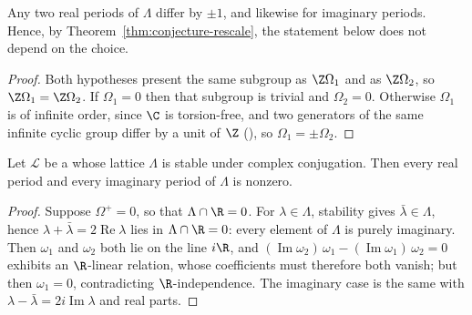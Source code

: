 \begin{lemma}
  \label{lem:periods-unique}
  Any two real periods of $\Lambda$ differ by $\pm1$, and likewise for imaginary periods.
  Hence, by Theorem~\ref{thm:conjecture-rescale}, the statement below does not depend on the
  choice.
\end{lemma}
\begin{proof}
  Both hypotheses present the same subgroup as $\Z\Omega_{1}$ and as $\Z\Omega_{2}$, so
  $\Z\Omega_{1}=\Z\Omega_{2}$. If $\Omega_{1}=0$ then that subgroup is trivial and
  $\Omega_{2}=0$. Otherwise $\Omega_{1}$ is of infinite order, since $\C$ is torsion-free, and
  two generators of the same infinite cyclic group differ by a unit of $\Z$
  (), so $\Omega_{1}=\pm\Omega_{2}$.
\end{proof}

\begin{lemma}
  \label{lem:periods-ne-zero}
  Let $\mathcal{L}$ be a  whose lattice $\Lambda$ is stable under complex
  conjugation. Then every real period and every imaginary period of $\Lambda$ is nonzero.
\end{lemma}
\begin{proof}
  Suppose $\Omega^{+}=0$, so that $\Lambda \cap \R = 0$. For $\lambda \in \Lambda$, stability
  gives $\bar{\lambda} \in \Lambda$, hence $\lambda+\bar{\lambda} = 2\operatorname{Re}\lambda$
  lies in $\Lambda \cap \R = 0$: every element of $\Lambda$ is purely imaginary. Then
  $\omega_{1}$ and $\omega_{2}$ both lie on the line $i\R$, and
  $(\operatorname{Im}\omega_{2})\,\omega_{1} - (\operatorname{Im}\omega_{1})\,\omega_{2} = 0$
  exhibits an $\R$-linear relation, whose coefficients must therefore both vanish; but then
  $\omega_{1}=0$, contradicting $\R$-independence. The imaginary case is the same with
  $\lambda-\bar{\lambda} = 2i\operatorname{Im}\lambda$ and real parts.
\end{proof}

